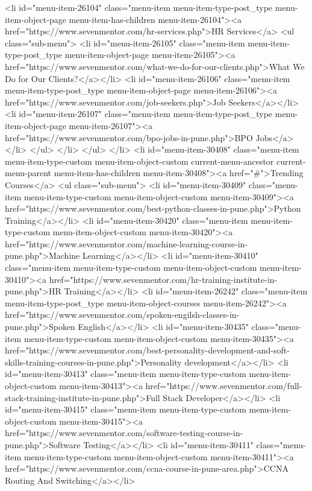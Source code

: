 {<li id="menu-item-26104" class="menu-item menu-item-type-post_type menu-item-object-page menu-item-has-children menu-item-26104"><a href="https://www.sevenmentor.com/hr-services.php">HR Services</a>
<ul class="sub-menu">
<li id="menu-item-26105" class="menu-item menu-item-type-post_type menu-item-object-page menu-item-26105"><a href="https://www.sevenmentor.com/what-we-do-for-our-clients.php">What We Do for Our Clients?</a></li>
<li id="menu-item-26106" class="menu-item menu-item-type-post_type menu-item-object-page menu-item-26106"><a href="https://www.sevenmentor.com/job-seekers.php">Job Seekers</a></li>
<li id="menu-item-26107" class="menu-item menu-item-type-post_type menu-item-object-page menu-item-26107"><a href="https://www.sevenmentor.com/bpo-jobs-in-pune.php">BPO Jobs</a></li>
</ul>
</li>
</ul>
</li>
<li id="menu-item-30408" class="menu-item menu-item-type-custom menu-item-object-custom current-menu-ancestor current-menu-parent menu-item-has-children menu-item-30408"><a href="#">Trending Courses</a>
<ul class="sub-menu">
<li id="menu-item-30409" class="menu-item menu-item-type-custom menu-item-object-custom menu-item-30409"><a href="https://www.sevenmentor.com/best-python-classes-in-pune.php">Python Training</a></li>
<li id="menu-item-30420" class="menu-item menu-item-type-custom menu-item-object-custom menu-item-30420"><a href="https://www.sevenmentor.com/machine-learning-course-in-pune.php">Machine Learning</a></li>
<li id="menu-item-30410" class="menu-item menu-item-type-custom menu-item-object-custom menu-item-30410"><a href="https://www.sevenmentor.com/hr-training-institute-in-pune.php">HR Training</a></li>
<li id="menu-item-26242" class="menu-item menu-item-type-post_type menu-item-object-courses menu-item-26242"><a href="https://www.sevenmentor.com/spoken-engilsh-classes-in-pune.php">Spoken English</a></li>
<li id="menu-item-30435" class="menu-item menu-item-type-custom menu-item-object-custom menu-item-30435"><a href="https://www.sevenmentor.com/best-personality-development-and-soft-skills-training-courses-in-pune.php">Personality development</a></li>
<li id="menu-item-30413" class="menu-item menu-item-type-custom menu-item-object-custom menu-item-30413"><a href="https://www.sevenmentor.com/full-stack-training-institute-in-pune.php">Full Stack Developer</a></li>
<li id="menu-item-30415" class="menu-item menu-item-type-custom menu-item-object-custom menu-item-30415"><a href="https://www.sevenmentor.com/software-testing-course-in-pune.php">Software Testing</a></li>
<li id="menu-item-30411" class="menu-item menu-item-type-custom menu-item-object-custom menu-item-30411"><a href="https://www.sevenmentor.com/ccna-course-in-pune-area.php">CCNA Routing And Switching</a></li>
}
